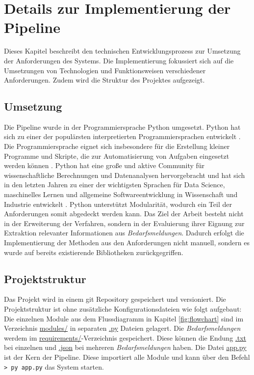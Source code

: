 \section{Details zur Implementierung der Pipeline}
Dieses Kapitel beschreibt den technischen Entwicklungsprozess zur Umsetzung der Anforderungen des Systems. Die Implementierung fokussiert sich auf die Umsetzungen von Technologien und Funktionsweisen verschiedener Anforderungen. Zudem wird die Struktur des Projektes aufgezeigt.
\subsection{Umsetzung}
Die Pipeline wurde in der Programmiersprache Python umgesetzt. Python hat sich zu einer der populärsten interpretierten Programmiersprachen entwickelt \cite{mckinney2012python}. Die Programmiersprache eignet sich insbesondere für die Erstellung kleiner Programme und Skripte, die zur Automatisierung von Aufgaben eingesetzt werden können \cite{mckinney2012python}. Python hat eine große und aktive Community für wissenschaftliche Berechnungen und Datenanalysen hervorgebracht und hat sich in den letzten Jahren zu einer der wichtigsten Sprachen für Data Science, maschinelles Lernen und allgemeine Softwareentwicklung in Wissenschaft und Industrie entwickelt \cite{mckinney2012python}. Python unterstützt Modularität, wodurch ein Teil der Anforderungen somit abgedeckt werden kann. Das Ziel der Arbeit besteht nicht in der Erweiterung der Verfahren, sondern in der Evaluierung ihrer Eignung zur Extraktion relevanter Informationen aus \emph{Bedarfsmeldungen}. Dadurch erfolgt die Implementierung der Methoden aus den Anforderungen nicht manuell, sondern es wurde auf bereits existierende Bibliotheken zurückgegriffen.
\subsection{Projektstruktur}
\label{sec:projektstruktur}
Das Projekt wird in einem git Repository gespeichert und versioniert. Die Projektstruktur ist ohne zusätzliche Konfigurationsdateien wie folgt aufgebaut:
Die einzelnen Module aus dem Flussdiagramm in Kapitel \ref{fig:flowchart} sind im Verzeichnis \url{modules/} in separaten \url{.py} Dateien gelagert. Die \emph{Bedarfsmeldungen} werdem im \url{requirements/}-Verzeichnis gespeichert. Diese können die Endung \url{.txt} bei einzelnen und \url{.json} bei mehreren \emph{Bedarfsmeldungen} haben. Die Datei \url{app.py} ist der Kern der Pipeline. Diese importiert alle Module und kann über den Befehl \lstinline{> py app.py}
 das System starten.
